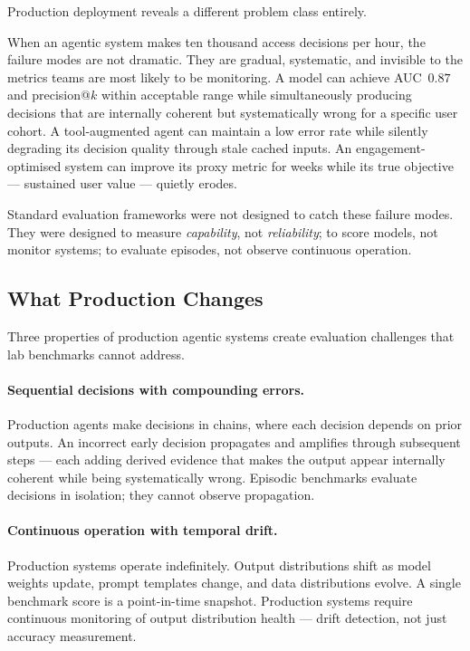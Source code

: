 \documentclass{article}
\begin{document}
Production deployment reveals a different problem class entirely.

When an agentic system makes ten thousand access decisions per hour, the
failure modes are not dramatic.  They are gradual, systematic, and invisible
to the metrics teams are most likely to be monitoring.  A model can achieve
AUC~$0.87$ and precision@$k$ within acceptable range while simultaneously
producing decisions that are internally coherent but systematically wrong for a
specific user cohort.  A tool-augmented agent can maintain a low error rate
while silently degrading its decision quality through stale cached inputs.  An
engagement-optimised system can improve its proxy metric for weeks while its
true objective --- sustained user value --- quietly erodes.

Standard evaluation frameworks were not designed to catch these failure modes.
They were designed to measure \emph{capability}, not \emph{reliability}; to
score models, not monitor systems; to evaluate episodes, not observe continuous
operation.

\subsection{What Production Changes}

Three properties of production agentic systems create evaluation challenges
that lab benchmarks cannot address.

\paragraph{Sequential decisions with compounding errors.}
Production agents make decisions in chains, where each decision depends on
prior outputs.  An incorrect early decision propagates and amplifies through
subsequent steps --- each adding derived evidence that makes the output appear
internally coherent while being systematically wrong.  Episodic benchmarks
evaluate decisions in isolation; they cannot observe propagation.

\paragraph{Continuous operation with temporal drift.}
Production systems operate indefinitely.  Output distributions shift as model
weights update, prompt templates change, and data distributions evolve.  A
single benchmark score is a point-in-time snapshot.  Production systems require
continuous monitoring of output distribution health --- drift detection, not
just accuracy measurement.
\end{document}
